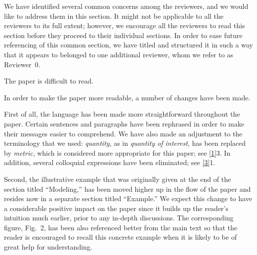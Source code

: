 We have identified several common concerns among the reviewers, and we would
like to address them in this section. It might not be applicable to all the
reviewers to its full extent; however, we encourage all the reviewers to read
this section before they proceed to their individual sections. In order to ease
future referencing of this common section, we have titled and structured it in
such a way that it appears to belonged to one additional reviewer, whom we refer
to as Reviewer~0.

\vspace{2em}

\begin{reviewer}
 The paper is difficult to read.
\end{reviewer}

\begin{authors}
In order to make the paper more readable, a number of changes have been made.

First of all, the language has been made more straightforward throughout the
paper. Certain sentences and paragraphs have been rephrased in order to make
their messages easier to comprehend. We have also made an adjustment to the
terminology that we used: \emph{quantity}, as in \emph{quantity of interest},
has been replaced by \emph{metric}, which is considered more appropriate for
this paper; see \cref{1}{3}. In addition, several colloquial expressions have
been eliminated; see \cref{3}{1}.

Second, the illustrative example that was originally given at the end of
the section titled ``Modeling,'' has been moved higher up in the flow of the
paper and resides now in a separate section titled ``Example.'' We expect this
change to have a considerable positive impact on the paper since it builds up
the reader's intuition much earlier, prior to any in-depth discussions. The
corresponding figure, Fig.~2, has been also referenced better from the main text
so that the reader is encouraged to recall this concrete example when it is
likely to be of great help for understanding.

\begin{actions}

\end{actions}
\end{authors}

